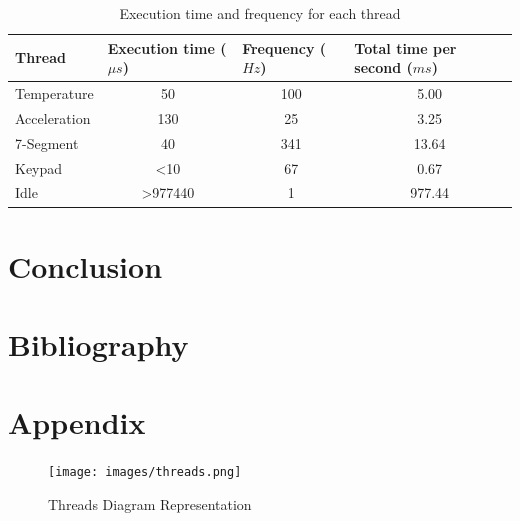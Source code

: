 \documentclass[12pt]{article}
\begin{document}
\begin{table}[!h]
\centering
\caption{Execution time and frequency for each thread}
\label{Table_threads}
\begin{tabular}{|l|c|c|c|}
\hline
\textbf{Thread} & \multicolumn{1}{l|}{\textbf{Execution time ($\mu s$)}} & \multicolumn{1}{l|}{\textbf{Frequency ($Hz$)}} & \multicolumn{1}{l|}{\textbf{Total time per second ($ms$)}} \\ \hline
Temperature & 50 & 100 & 5.00 \\ \hline
Acceleration & 130 & 25 & 3.25 \\ \hline
7-Segment & 40 & 341 & 13.64 \\ \hline
Keypad & \textless10 & 67 & 0.67 \\ \hline
Idle & \textgreater977440 & 1 & 977.44 \\ \hline
\end{tabular}
\end{table}

\section{Conclusion}

\newpage
\section{Bibliography}



\newpage
\section{Appendix}
\begin{figure}[!htb]
 \centering
 \texttt{[image: images/threads.png]}
 \caption{Threads Diagram Representation}
 \label{fig:threads}
\end{figure}
\end{document}
